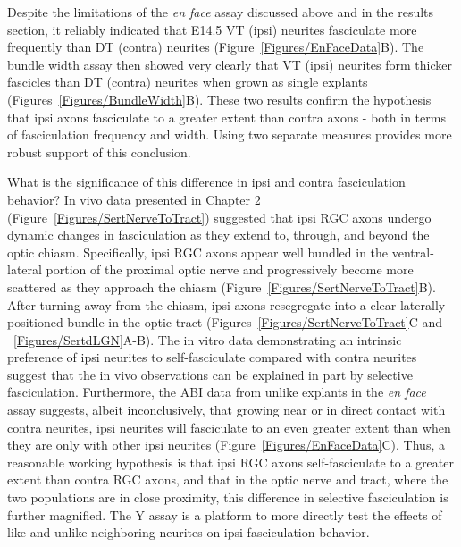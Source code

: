 Despite the limitations of the \emph{en face} assay discussed above and in the results section, it reliably indicated that E14.5 VT (ipsi) neurites fasciculate more frequently than DT (contra) neurites (Figure~\ref{Figures/EnFaceData}B).
The bundle width assay then showed very clearly that VT (ipsi) neurites form thicker fascicles than DT (contra) neurites when grown as single explants (Figures~\ref{Figures/BundleWidth}B).
These two results confirm the hypothesis that ipsi axons fasciculate to a greater extent than contra axons - both in terms of fasciculation frequency and width.
Using two separate measures provides more robust support of this conclusion.

What is the significance of this difference in ipsi and contra fasciculation behavior?
In vivo data presented in Chapter 2 (Figure~\ref{Figures/SertNerveToTract}) suggested that ipsi RGC axons undergo dynamic changes in fasciculation as they extend to, through, and beyond the optic chiasm.
Specifically, ipsi RGC axons appear well bundled in the ventral-lateral portion of the proximal optic nerve and progressively become more scattered as they approach the chiasm (Figure~\ref{Figures/SertNerveToTract}B).
After turning away from the chiasm, ipsi axons resegregate into a clear laterally-positioned bundle in the optic tract (Figures~\ref{Figures/SertNerveToTract}C and ~\ref{Figures/SertdLGN}A-B).
The in vitro data demonstrating an intrinsic preference of ipsi neurites to self-fasciculate compared with contra neurites suggest that the in vivo observations can be explained in part by selective fasciculation.
Furthermore, the ABI data from unlike explants in the \emph{en face} assay suggests, albeit inconclusively, that growing near or in direct contact with contra neurites, ipsi neurites will fasciculate to an even greater extent than when they are only with other ipsi neurites (Figure~\ref{Figures/EnFaceData}C).
Thus, a reasonable working hypothesis is that ipsi RGC axons self-fasciculate to a greater extent than contra RGC axons, and that in the optic nerve and tract, where the two populations are in close proximity, this difference in selective fasciculation is further magnified.
The Y assay is a platform to more directly test the effects of like and unlike neighboring neurites on ipsi fasciculation behavior.

